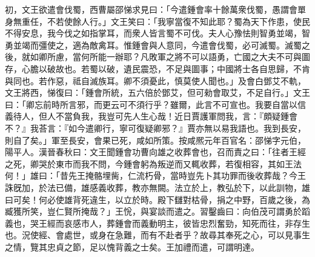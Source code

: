 \begin{pinyinscope}
初，文王欲遣會伐蜀，西曹屬邵悌求見曰：「今遣鍾會率十餘萬衆伐蜀，愚謂會單身無重任，不若使餘人行。」文王笑曰：「我寧當復不知此耶？蜀為天下作患，使民不得安息，我今伐之如指掌耳，而衆人皆言蜀不可伐。夫人心豫怯則智勇並竭，智勇並竭而彊使之，適為敵禽耳。惟鍾會與人意同，今遣會伐蜀，必可滅蜀。滅蜀之後，就如卿所慮，當何所能一辦耶？凡敗軍之將不可以語勇，亡國之大夫不可與圖存，心膽以破故也。若蜀以破，遺民震恐，不足與圖事；中國將士各自思歸，不肯與同也。若作惡，祗自滅族耳。卿不須憂此，慎莫使人聞也。」及會白鄧艾不軌，文王將西，悌復曰：「鍾會所統，五六倍於鄧艾，但可勑會取艾，不足自行。」文王曰：「卿忘前時所言邪，而更云可不須行乎？雖爾，此言不可宣也。我要自當以信義待人，但人不當負我，我豈可先人生心哉！近日賈護軍問我，言：『頗疑鍾會不？』我荅言：『如今遣卿行，寧可復疑卿邪？』賈亦無以易我語也。我到長安，則自了矣。」軍至長安，會果已死，咸如所策。按咸熈元年百官名：邵悌字元伯，陽平人。漢晉春秋曰：文王聞鍾會功曹向雄之收葬會也，召而責之曰：「往者王經之死，卿哭於東市而我不問，今鍾會躬為叛逆而又輒收葬，若復相容，其如王法何！」雄曰：「昔先王掩骼埋胔，仁流朽骨，當時豈先卜其功罪而後收葬哉？今王誅旣加，於法已備，雄感義收葬，教亦無闕。法立於上，教弘於下，以此訓物，雄曰可矣！何必使雄背死違生，以立於時。殿下讎對枯骨，捐之中野，百歲之後，為臧獲所笑，豈仁賢所掩哉？」王恱，與宴談而遣之。習鑿齒曰：向伯茂可謂勇於蹈義也，哭王經而哀感市人，葬鍾會而義動明主，彼皆忠烈奮勁，知死而往，非存生也。況使經、會處世，或身在急難，而有不赴者乎？故尋其奉死之心，可以見事生之情，覽其忠貞之節，足以愧背義之士矣。王加禮而遣，可謂明達。


\end{pinyinscope}
